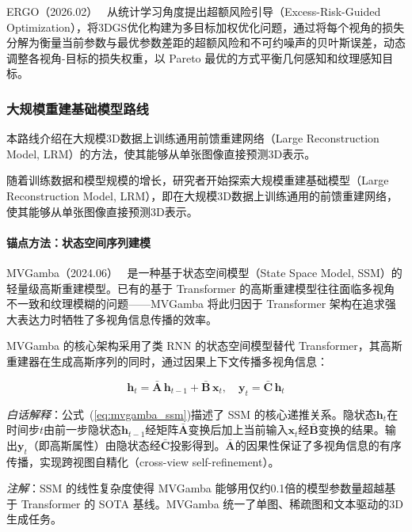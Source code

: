 ERGO（2026.02）~\cite{2602_10278} 从统计学习角度提出超额风险引导（Excess-Risk-Guided Optimization），将3DGS优化构建为多目标加权优化问题，通过将每个视角的损失分解为衡量当前参数与最优参数差距的超额风险和不可约噪声的贝叶斯误差，动态调整各视角-目标的损失权重，以 Pareto 最优的方式平衡几何感知和纹理感知目标。

\subsubsection{大规模重建基础模型路线}
\label{sec:08_2_1_3}

本路线介绍在大规模3D数据上训练通用前馈重建网络（Large Reconstruction Model, LRM）的方法，使其能够从单张图像直接预测3D表示。

随着训练数据和模型规模的增长，研究者开始探索大规模重建基础模型（Large Reconstruction Model, LRM），即在大规模3D数据上训练通用的前馈重建网络，使其能够从单张图像直接预测3D表示。

\paragraph{锚点方法：状态空间序列建模}

MVGamba（2024.06）~\cite{2406_06367} 是一种基于状态空间模型（State Space Model, SSM）的轻量级高斯重建模型。已有的基于 Transformer 的高斯重建模型往往面临多视角不一致和纹理模糊的问题——MVGamba 将此归因于 Transformer 架构在追求强大表达力时牺牲了多视角信息传播的效率。

MVGamba 的核心架构采用了类 RNN 的状态空间模型替代 Transformer，其高斯重建器在生成高斯序列的同时，通过因果上下文传播多视角信息：

\begin{equation}
\label{eq:mvgamba_ssm}
\mathbf{h}_t = \bar{\mathbf{A}} \, \mathbf{h}_{t-1} + \bar{\mathbf{B}} \, \mathbf{x}_t, \quad \mathbf{y}_t = \bar{\mathbf{C}} \, \mathbf{h}_t
\end{equation}

\textit{白话解释}：公式~(\ref{eq:mvgamba_ssm})描述了 SSM 的核心递推关系。隐状态$\mathbf{h}_t$在时间步$t$由前一步隐状态$\mathbf{h}_{t-1}$经矩阵$\bar{\mathbf{A}}$变换后加上当前输入$\mathbf{x}_t$经$\bar{\mathbf{B}}$变换的结果。输出$\mathbf{y}_t$（即高斯属性）由隐状态经$\bar{\mathbf{C}}$投影得到。$\bar{\mathbf{A}}$的因果性保证了多视角信息的有序传播，实现跨视图自精化（cross-view self-refinement）。

\textit{注解}：SSM 的线性复杂度使得 MVGamba 能够用仅约0.1倍的模型参数量超越基于 Transformer 的 SOTA 基线。MVGamba 统一了单图、稀疏图和文本驱动的3D生成任务。

